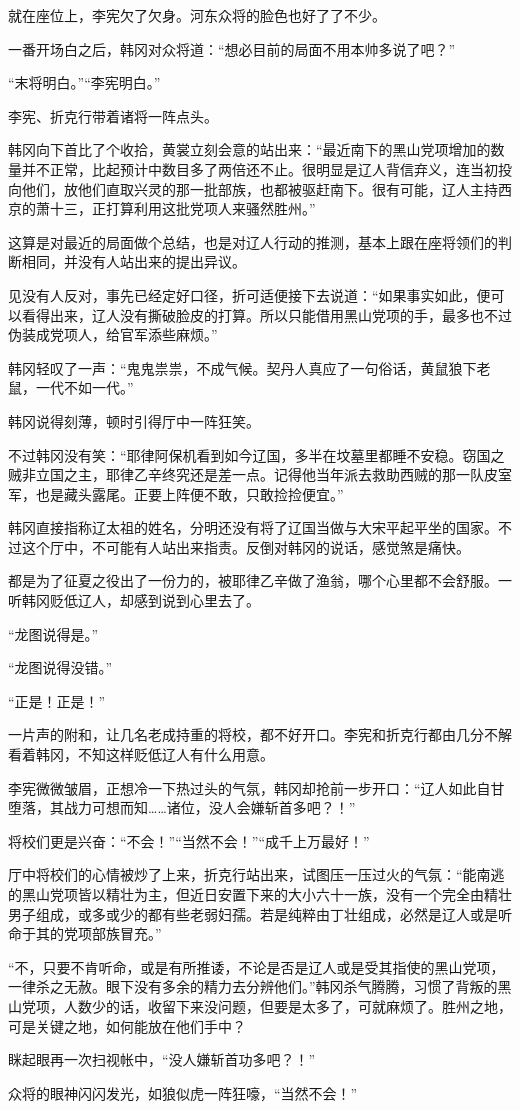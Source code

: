 就在座位上，李宪欠了欠身。河东众将的脸色也好了了不少。

一番开场白之后，韩冈对众将道：“想必目前的局面不用本帅多说了吧？”

“末将明白。”“李宪明白。”

李宪、折克行带着诸将一阵点头。

韩冈向下首比了个收拾，黄裳立刻会意的站出来：“最近南下的黑山党项增加的数量并不正常，比起预计中数目多了两倍还不止。很明显是辽人背信弃义，连当初投向他们，放他们直取兴灵的那一批部族，也都被驱赶南下。很有可能，辽人主持西京的萧十三，正打算利用这批党项人来骚然胜州。”

这算是对最近的局面做个总结，也是对辽人行动的推测，基本上跟在座将领们的判断相同，并没有人站出来的提出异议。

见没有人反对，事先已经定好口径，折可适便接下去说道：“如果事实如此，便可以看得出来，辽人没有撕破脸皮的打算。所以只能借用黑山党项的手，最多也不过伪装成党项人，给官军添些麻烦。”

韩冈轻叹了一声：“鬼鬼祟祟，不成气候。契丹人真应了一句俗话，黄鼠狼下老鼠，一代不如一代。”

韩冈说得刻薄，顿时引得厅中一阵狂笑。

不过韩冈没有笑：“耶律阿保机看到如今辽国，多半在坟墓里都睡不安稳。窃国之贼非立国之主，耶律乙辛终究还是差一点。记得他当年派去救助西贼的那一队皮室军，也是藏头露尾。正要上阵便不敢，只敢捡捡便宜。”

韩冈直接指称辽太祖的姓名，分明还没有将了辽国当做与大宋平起平坐的国家。不过这个厅中，不可能有人站出来指责。反倒对韩冈的说话，感觉煞是痛快。

都是为了征夏之役出了一份力的，被耶律乙辛做了渔翁，哪个心里都不会舒服。一听韩冈贬低辽人，却感到说到心里去了。

“龙图说得是。”

“龙图说得没错。”

“正是！正是！”

一片声的附和，让几名老成持重的将校，都不好开口。李宪和折克行都由几分不解看着韩冈，不知这样贬低辽人有什么用意。

李宪微微皱眉，正想冷一下热过头的气氛，韩冈却抢前一步开口：“辽人如此自甘堕落，其战力可想而知……诸位，没人会嫌斩首多吧？！”

将校们更是兴奋：“不会！”“当然不会！”“成千上万最好！”

厅中将校们的心情被炒了上来，折克行站出来，试图压一压过火的气氛：“能南逃的黑山党项皆以精壮为主，但近日安置下来的大小六十一族，没有一个完全由精壮男子组成，或多或少的都有些老弱妇孺。若是纯粹由丁壮组成，必然是辽人或是听命于其的党项部族冒充。”

“不，只要不肯听命，或是有所推诿，不论是否是辽人或是受其指使的黑山党项，一律杀之无赦。眼下没有多余的精力去分辨他们。”韩冈杀气腾腾，习惯了背叛的黑山党项，人数少的话，收留下来没问题，但要是太多了，可就麻烦了。胜州之地，可是关键之地，如何能放在他们手中？

眯起眼再一次扫视帐中，“没人嫌斩首功多吧？！”

众将的眼神闪闪发光，如狼似虎一阵狂嚎，“当然不会！”

